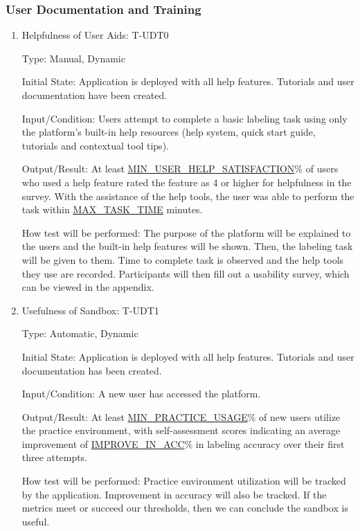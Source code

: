 \documentclass[12pt, titlepage]{article}
\begin{document}
\subsubsection{User Documentation and Training}

\begin{enumerate}

\item{Helpfulness of User Aids: T-UDT0\\}

Type: Manual, Dynamic
					
Initial State: Application is deployed with all help features. Tutorials and user documentation have been created.
					
Input/Condition: Users attempt to complete a basic labeling task using only the platform’s built-in help resources (help system, quick start guide, tutorials and contextual tool tips).
					
Output/Result: At least \hyperref[MIN_USER_HELP_SATISFACTION]{MIN\_USER\_HELP\_SATISFACTION}\% of users who used a help feature rated the feature as 4 or higher for helpfulness in the survey. With the assistance of the help tools, the user was able to perform the task within \hyperref[MAX_TASK_TIME]{MAX\_TASK\_TIME} minutes.
					
How test will be performed: The purpose of the platform will be explained to the users and the built-in help features will be shown. Then, the labeling task will be given to them. Time to complete task is observed and the help tools they use are recorded. Participants will then fill out a usability survey, which can be viewed in the appendix.

\item{Usefulness of Sandbox: T-UDT1\\}

Type: Automatic, Dynamic
					
Initial State: Application is deployed with all help features. Tutorials and user documentation has been created.
					
Input/Condition: A new user has accessed the platform.
					
Output/Result: At least \hyperref[MIN_PRACTICE_USAGE]{MIN\_PRACTICE\_USAGE}\% of new users utilize the practice environment, with self-assessment scores indicating an average improvement of \hyperref[IMPROVE_IN_ACC]{IMPROVE\_IN\_ACC}\% in labeling accuracy over their first three attempts.
					
How test will be performed: Practice environment utilization will be tracked by the application. Improvement in accuracy will also be tracked. If the metrics meet or succeed our thresholds, then we can conclude the sandbox is useful.
\end{enumerate}
\end{document}
